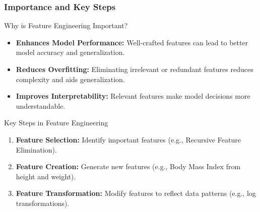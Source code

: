 \documentclass[aspectratio=169]{beamer}
\begin{document}
\begin{frame}[fragile]
    \frametitle{Importance and Key Steps}
    \begin{block}{Why is Feature Engineering Important?}
        \begin{itemize}
            \item \textbf{Enhances Model Performance:} Well-crafted features can lead to better model accuracy and generalization.
            \item \textbf{Reduces Overfitting:} Eliminating irrelevant or redundant features reduces complexity and aids generalization.
            \item \textbf{Improves Interpretability:} Relevant features make model decisions more understandable.
        \end{itemize}
    \end{block}
    
    \begin{block}{Key Steps in Feature Engineering}
        \begin{enumerate}
            \item \textbf{Feature Selection:} Identify important features (e.g., Recursive Feature Elimination).
            \item \textbf{Feature Creation:} Generate new features (e.g., Body Mass Index from height and weight).
            \item \textbf{Feature Transformation:} Modify features to reflect data patterns (e.g., log transformations).
        \end{enumerate}
    \end{block}
\end{frame}
\end{document}
